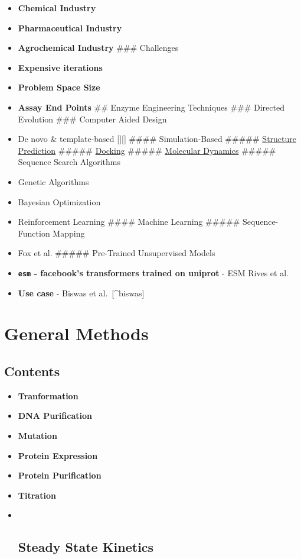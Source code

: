 \begin{itemize}
\tightlist
\item
  \textbf{Chemical Industry}
\item
  \textbf{Pharmaceutical Industry}
\item
  \textbf{Agrochemical Industry} \#\#\# Challenges
\item
  \textbf{Expensive iterations}
\item
  \textbf{Problem Space Size}
\item
  \textbf{Assay End Points} \#\# Enzyme Engineering Techniques \#\#\#
  Directed Evolution \#\#\# Computer Aided Design
\item
  De novo \& template-based {[}{]}{[}{]} \#\#\#\# Simulation-Based
  \#\#\#\#\# \href{protein-structure-mred.md}{Structure Prediction}
  \#\#\#\#\# \href{docking.md}{Docking} \#\#\#\#\#
  \href{molecular-dynamics.md}{Molecular Dynamics} \#\#\#\#\# Sequence
  Search Algorithms
\item
  Genetic Algorithms
\item
  Bayesian Optimization
\item
  Reinforcement Learning \#\#\#\# Machine Learning \#\#\#\#\#
  Sequence-Function Mapping
\item
  Fox et al. \#\#\#\#\# Pre-Trained Unsupervised Models
\item
  \textbf{\texttt{esm} - facebook's transformers trained on uniprot} -
  ESM Rives et al.
\item
  \textbf{Use case} - Biswas et al.~{[}\^{}biswas{]}
\end{itemize}

\bib

\hypertarget{general-methods}{%
\section{General Methods}\label{general-methods}}

\hypertarget{contents-7}{%
\subsection{Contents}\label{contents-7}}

\begin{itemize}
\item
  \textbf{Tranformation}
\item
  \textbf{DNA Purification}
\item
  \textbf{Mutation}
\item
  \textbf{Protein Expression}
\item
  \textbf{Protein Purification}
\item
  \textbf{Titration}
\item ~
  \hypertarget{steady-state-kinetics}{%
  \subsection{\texorpdfstring{\textbf{Steady State
  Kinetics}}{Steady State Kinetics}}\label{steady-state-kinetics}}
\end{itemize}

